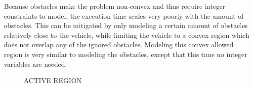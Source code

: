 Because obstacles make the problem non-convex and thus require integer constraints to model, the execution time scales very poorly with the amount of obstacles. This can be mitigated by only modeling a certain amount of obstacles relatively close to the vehicle, while limiting the vehicle to a convex region which does not overlap any of the ignored obstacles. Modeling this convex allowed region is very similar to modeling the obstacles, except that this time no integer variables are needed.

\begin{figure}[h]
ACTIVE REGION\\
\end{figure}